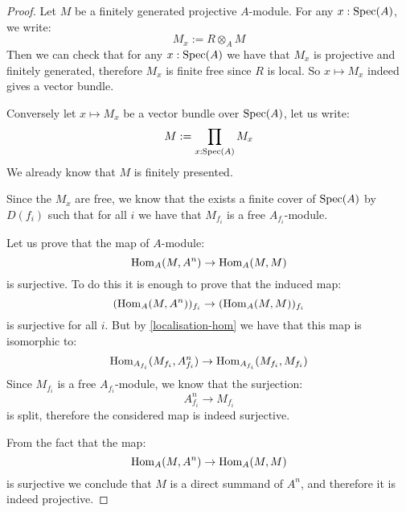 \begin{proof}
Let $M$ be a finitely generated projective $A$-module. For any $x:\operatorname{Spec}(A)$, we write:
\[M_x := R\otimes_AM\]
Then we can check that for any $x:\operatorname{Spec}(A)$ we have that $M_x$ is projective and finitely generated, therefore $M_x$ is finite free since $R$ is local. So $x\mapsto M_x$ indeed gives a vector bundle.

Conversely let $x\mapsto M_x$ be a vector bundle over $\operatorname{Spec}(A)$, let us write:
\[M:= \prod_{x:\operatorname{Spec}(A)} M_x\]
We already know that $M$ is finitely presented. 

Since the $M_x$ are free, we know that the exists a finite cover of $\operatorname{Spec}(A)$ by $D(f_i)$ such that for all $i$ we have that $M_{f_i}$ is a free $A_{f_i}$-module.

Let us prove that the map of $A$-module:
\[\mathrm{Hom}_A(M,A^n) \to \mathrm{Hom}_A(M,M)\]
is surjective. To do this it is enough to prove that the induced map:
\[(\mathrm{Hom}_A(M,A^n))_{f_i} \to (\mathrm{Hom}_A(M,M))_{f_i}\]
is surjective for all $i$. But by \cref{localisation-hom} we have that this map is isomorphic to:
\[\mathrm{Hom}_{A_{f_i}}(M_{f_i},A_{f_i}^n) \to \mathrm{Hom}_{A_{f_i}}(M_{f_i},M_{f_i})\]
Since $M_{f_i}$ is a free $A_{f_i}$-module, we know that the surjection:
\[A_{f_i}^n \to M_{f_i}\]
is split, therefore the considered map is indeed surjective.

From the fact that the map:
\[\mathrm{Hom}_A(M,A^n) \to \mathrm{Hom}_A(M,M)\]
is surjective we conclude that $M$ is a direct summand of $A^n$, and therefore it is indeed projective.
\end{proof}